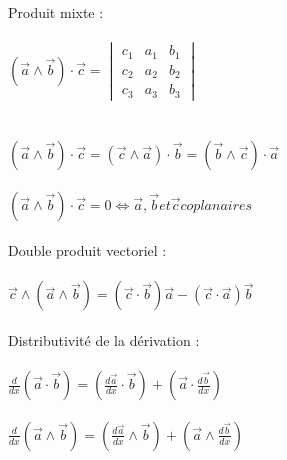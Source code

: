 \documentclass{article}
\begin{document}
Produit mixte :\\\\
\( (\overrightarrow{a} \wedge \overrightarrow{b}) \cdot \overrightarrow{c} = \begin{vmatrix}
    c_1 & a_1 & b_1 \\
    c_2 & a_2 & b_2 \\
    c_3 & a_3 & b_3
\end{vmatrix} \)\\\\\\
\( (\overrightarrow{a} \wedge \overrightarrow{b}) \cdot \overrightarrow{c} = (\overrightarrow{c} \wedge \overrightarrow{a}) \cdot \overrightarrow{b} = (\overrightarrow{b} \wedge \overrightarrow{c}) \cdot \overrightarrow{a}\) \\\\
\( (\overrightarrow{a} \wedge \overrightarrow{b}) \cdot \overrightarrow{c} = 0 \Leftrightarrow \overrightarrow{a}, \overrightarrow{b} et \overrightarrow{c} coplanaires\)\\\\
Double produit vectoriel :\\\\
\( \overrightarrow{c} \wedge (\overrightarrow{a} \wedge \overrightarrow{b})  = (\overrightarrow{c} \cdot \overrightarrow{b})\overrightarrow{a} - (\overrightarrow{c} \cdot \overrightarrow{a})\overrightarrow{b} \) \\\\
Distributivité de la dérivation :\\\\
\( \frac{d}{dx}(\overrightarrow{a} \cdot \overrightarrow{b}) = (\frac{d\overrightarrow{a}}{dx} \cdot \overrightarrow{b}) + (\overrightarrow{a} \cdot \frac{d\overrightarrow{b}}{dx}) \) \\\\
\( \frac{d}{dx}(\overrightarrow{a} \wedge \overrightarrow{b}) = (\frac{d\overrightarrow{a}}{dx} \wedge \overrightarrow{b}) + (\overrightarrow{a} \wedge \frac{d\overrightarrow{b}}{dx}) \)\\
\end{document}
